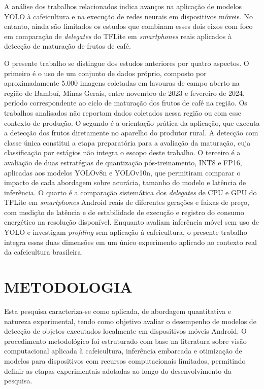 \documentclass[artigo,times,capa]{iftex2024}
\begin{document}
\FloatBarrier

A análise dos trabalhos relacionados indica avanços na
aplicação de modelos \ac{YOLO} à cafeicultura e na execução de redes neurais
em dispositivos móveis. No entanto, ainda são limitados os estudos que combinam
esses dois eixos com foco em comparação de \textit{delegates}
do \ac{TFLite} em \textit{smartphones} reais aplicados à detecção de maturação
de frutos de café.

O presente trabalho se distingue dos estudos anteriores por quatro aspectos. O
primeiro é o uso de um conjunto de dados próprio, composto por aproximadamente
5.000 imagens coletadas em lavouras de campo aberto na região de Bambuí, Minas Gerais, entre novembro de 2023 e fevereiro de 2024, período correspondente ao ciclo de maturação dos frutos de café na região. Os
trabalhos analisados não reportam dados coletados nessa região ou com esse
contexto de produção. O segundo é a orientação prática da aplicação, que executa a
detecção dos frutos diretamente no aparelho do produtor rural. A detecção com
classe única constitui a etapa preparatória para a avaliação da maturação, cuja
classificação por estágios não integra o escopo deste trabalho. O terceiro é a avaliação de
duas estratégias de quantização pós-treinamento, \ac{INT8} e \ac{FP16},
aplicadas aos modelos YOLOv8n e YOLOv10n, que permitiram
comparar o impacto de cada abordagem sobre acurácia, tamanho do modelo e
latência de inferência. O quarto é a
comparação sistemática dos \textit{delegates} de \ac{CPU} e \ac{GPU} do
\ac{TFLite} em \textit{smartphones} Android reais de diferentes gerações e
faixas de preço, com medição de latência e de estabilidade de
execução e registro do consumo energético na resolução disponível. Enquanto \textcite{Hirsch2025Exploring} avaliam inferência móvel
sem uso de \ac{YOLO} e \textcite{Chu2023nnPerf} investigam
\textit{profiling} sem aplicação à cafeicultura, o presente trabalho integra
essas duas dimensões em um único experimento aplicado ao contexto real da
cafeicultura brasileira.

\FloatBarrier

\section{METODOLOGIA}
\label{sec:metodologia}

Esta pesquisa caracteriza-se como aplicada, de abordagem quantitativa e natureza experimental, tendo como objetivo avaliar o desempenho de modelos de detecção de objetos executados localmente em dispositivos móveis Android. O procedimento metodológico foi estruturado com base na literatura sobre visão computacional aplicada à cafeicultura, inferência embarcada e otimização de modelos para dispositivos com recursos computacionais limitados, permitindo definir as etapas experimentais adotadas ao longo do desenvolvimento da pesquisa.
\end{document}
